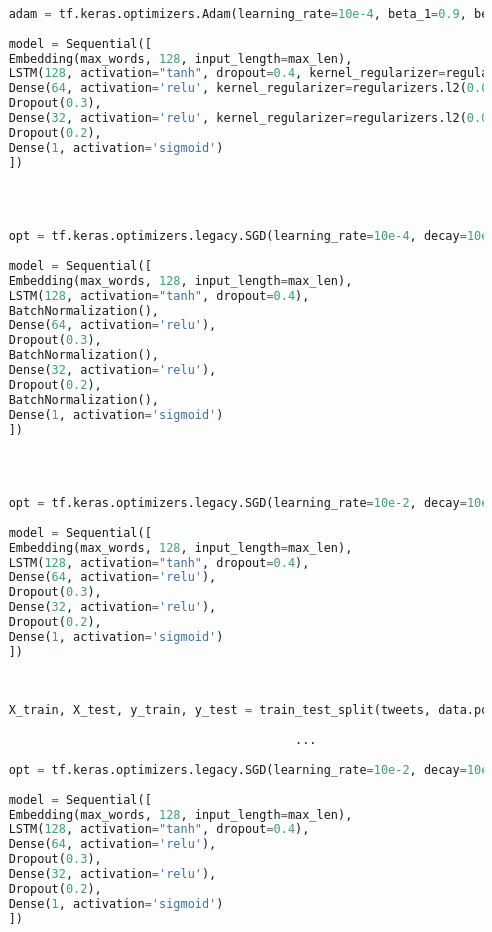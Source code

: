 \begin{lstlisting}[language=Python, label={lst:l7},caption=Third LSTM]
	
	adam = tf.keras.optimizers.Adam(learning_rate=10e-4, beta_1=0.9, beta_2=0.999, epsilon=1e-7)
	
	model = Sequential([
	Embedding(max_words, 128, input_length=max_len),
	LSTM(128, activation="tanh", dropout=0.4, kernel_regularizer=regularizers.l2(0.001)),
	Dense(64, activation='relu', kernel_regularizer=regularizers.l2(0.001)),
	Dropout(0.3),
	Dense(32, activation='relu', kernel_regularizer=regularizers.l2(0.001)),
	Dropout(0.2),
	Dense(1, activation='sigmoid')
	])
	
\end{lstlisting}


\begin{lstlisting}[language=Python, label={lst:l8},caption=Fourth LSTM]
	
	
	opt = tf.keras.optimizers.legacy.SGD(learning_rate=10e-4, decay=10e-6, momentum=0.6)
	
	model = Sequential([
	Embedding(max_words, 128, input_length=max_len),
	LSTM(128, activation="tanh", dropout=0.4),
	BatchNormalization(),
	Dense(64, activation='relu'),
	Dropout(0.3),
	BatchNormalization(),
	Dense(32, activation='relu'),
	Dropout(0.2),
	BatchNormalization(),
	Dense(1, activation='sigmoid')
	])
	
\end{lstlisting}


\begin{lstlisting}[language=Python, label={lst:l9},caption=Fifth LSTM]
	
	
	opt = tf.keras.optimizers.legacy.SGD(learning_rate=10e-2, decay=10e-5, momentum=0.6)
	
	model = Sequential([
	Embedding(max_words, 128, input_length=max_len),
	LSTM(128, activation="tanh", dropout=0.4),
	Dense(64, activation='relu'),
	Dropout(0.3),
	Dense(32, activation='relu'),
	Dropout(0.2),
	Dense(1, activation='sigmoid')
	])
	
\end{lstlisting}


\begin{lstlisting}[language=Python, label={lst:l10},caption=Sixth LSTM]
	
	X_train, X_test, y_train, y_test = train_test_split(tweets, data.polarity.values, test_size=0.2, random_state=101)
	
											...
	
	opt = tf.keras.optimizers.legacy.SGD(learning_rate=10e-2, decay=10e-5, momentum=0.6)
	
	model = Sequential([
	Embedding(max_words, 128, input_length=max_len),
	LSTM(128, activation="tanh", dropout=0.4),
	Dense(64, activation='relu'),
	Dropout(0.3),
	Dense(32, activation='relu'),
	Dropout(0.2),
	Dense(1, activation='sigmoid')
	])
		
\end{lstlisting}


